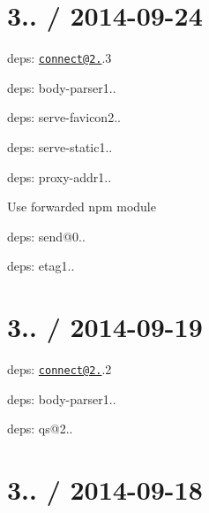 {\ttfamily \section*{3.. / 2014-\/09-\/24 }}

{\ttfamily }

{\ttfamily 
\begin{DoxyItemize}
\item deps\+: \href{mailto:connect@2.26}{\tt connect@2.}.3
\begin{DoxyItemize}
\item deps\+: body-\/parser1..
\item deps\+: serve-\/favicon2..
\item deps\+: serve-\/static1..
\end{DoxyItemize}
\item deps\+: proxy-\/addr1..
\begin{DoxyItemize}
\item Use {\ttfamily forwarded} npm module
\end{DoxyItemize}
\item deps\+: send@0..
\begin{DoxyItemize}
\item deps\+: etag1..
\end{DoxyItemize}
\end{DoxyItemize}}

{\ttfamily \section*{3.. / 2014-\/09-\/19 }}

{\ttfamily }

{\ttfamily 
\begin{DoxyItemize}
\item deps\+: \href{mailto:connect@2.26}{\tt connect@2.}.2
\begin{DoxyItemize}
\item deps\+: body-\/parser1..
\item deps\+: qs@2..
\end{DoxyItemize}
\end{DoxyItemize}}

{\ttfamily \section*{3.. / 2014-\/09-\/18 }}

{\ttfamily }

